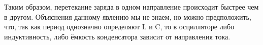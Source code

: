\documentclass[ a4paper]{article}
\begin{document}
\begin{figure}[htb]
\begin{minipage}[h]{0.45\linewidth}
	\end{minipage}
	\hfill
	\begin{minipage}[h]{0.45\textwidth}
	\end{minipage}
\end{figure}
Таким образом, перетекание заряда в одном направление происходит быстрее чем в другом. 
Объяснения данному явлению мы не знаем, но можно предположить, что, так как период однозначно определяют L и C, то 
в осцилляторе либо  индуктивность, либо ёмкость конденсатора зависит от направления тока.
	
\end{document}
